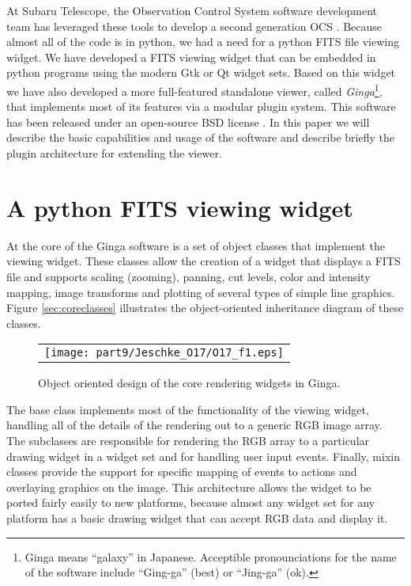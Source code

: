 At Subaru Telescope, the Observation Control System software development
team has leveraged these tools to develop a second generation
OCS \citep{Jeschke10B}.  
Because almost all of the code is in python, we had a need for a python
FITS file viewing widget.  We have developed a FITS viewing widget that
can be embedded in python programs using the modern Gtk or Qt widget
sets.
Based on this widget we have also developed a more full-featured
standalone viewer, called \emph{Ginga}\footnote{Ginga means ``galaxy''
  in Japanese. Acceptible pronounciations for the name of the software
  include ``Ging-ga'' (best) or ``Jing-ga'' (ok).}, 
that implements most of its features via a modular plugin system.
This software has been released under an open-source BSD
license \citep{Jeschke12}.
In this paper we will describe the basic capabilities and usage of the
software and describe briefly the plugin architecture for extending the
viewer.

\section{A python FITS viewing widget}
At the core of the Ginga software is a set of object classes that
implement the viewing widget.  These classes allow the creation of
a widget that displays a FITS file and supports scaling (zooming),
panning, cut levels, color and intensity mapping, image transforms and
plotting of several types of simple line graphics.   
Figure \ref{sec:coreclasses} illustrates the object-oriented inheritance
diagram of these classes.
\label{sec:coreclasses}
\begin{figure}
  \begin{center}
    \begin{tabular}{c}
      \texttt{[image: part9/Jeschke\_O17/O17\_f1.eps]}
    \end{tabular}
  \end{center}
  \caption[example] 
          { \label{fig:onion} 
            Object oriented design of the core rendering widgets in Ginga.} 
\end{figure} 
The base class implements most of the functionality of the viewing
widget, handling all of the details of the rendering out to a generic
RGB image array.
The subclasses are responsible for rendering the RGB array to a
particular drawing widget in a widget set and for handling user input
events. 
Finally, mixin classes \citep{mixins}
provide the support for specific mapping of events to actions and
overlaying graphics on the image.
This architecture allows the widget to be ported fairly easily to new
platforms, because almost any widget set for any platform has a basic
drawing widget that can accept RGB data and display it.


